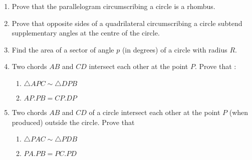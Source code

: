 \begin{enumerate}[label=\arabic*.,ref=\thesubsection.\theenumi]
\item  Prove that the parallelogram circumscribing a circle is a rhombus.
%
\item Prove that opposite sides of a quadrilateral circumscribing a circle subtend supplementary angles at the centre of the circle.
%
\item Find the area of a sector of angle $p$ (in degrees) of a circle with radius $R$. 
\item  Two chords $AB$ and $CD$ intersect each other at the point $P$. Prove that : 
\begin{enumerate}
\item   $\triangle  APC  \sim   \triangle  DPB$
\item  $AP . PB = CP . DP$
\end{enumerate}
\item Two chords $AB$ and $CD$ of a circle intersect each other at the point $P$ (when produced) outside the circle. Prove that 
\begin{enumerate}
\item   $\triangle  PAC  \sim   \triangle  PDB$
\item  $PA . PB = PC . PD$
\end{enumerate}
\end{enumerate}
